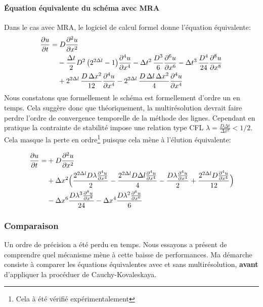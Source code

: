 \paragraph{Équation équivalente du schéma avec MRA}
    Dans le cas avec MRA, le logiciel de calcul formel donne l'équation équivalente:
    \begin{align}
        \frac{\partial u}{\partial t} =&\; D \frac{\partial^2 u}{\partial x^2} \\\notag
        &- \frac{\Delta t}{2} D^2\, \bigl( 2^{2\Delta l}- 1 \bigr)          \frac{\partial^4 u}{\partial x^4}
        - \Delta t^2\, \frac{D^3}{6}          \frac{\partial^6 u}{\partial x^6}
        - \Delta t^3\, \frac{D^4}{24}         \frac{\partial^8 u}{\partial x^8} \\\notag
        &+ 2^{2\Delta l}\, \frac{D\, \Delta x^2}{12}    \frac{\partial^4 u}{\partial x^4}
        - 2^{2\Delta l}\, \frac{D\, \Delta l\, \Delta x^2}{4} \frac{\partial^4 u}{\partial x^4}
    \end{align}
    Nous constatons que formellement le schéma est formellement d'ordre un en temps.
    Cela suggère donc que théoriquement, la multirésolution devrait faire perdre l'ordre de convergence temporelle de la méthode des lignes.
    Cependant en pratique la contrainte de stabilité impose une relation type CFL $\lambda = \frac{D \Delta t } {\Delta x^2} < 1/2$.
    Cela masque la perte en ordre\footnote{Cela à été vérifié expérimentalement} puisque cela mène à l’élution équivalente:

    \begin{align}
        \frac{\partial u}{\partial t}
        =&+ D \frac{\partial^{2}u}{\partial x^{2}}\\\notag
        &+ \Delta x^{2}\Bigl(\frac{2^{2 \Delta l} D  \lambda \frac{\partial^{4}u}{\partial x^{4}}}{2} 
        -  \frac{2^{2 \Delta l} D \Delta l \frac{\partial^{4}u}{\partial x^{4}}}{4} 
        -  \frac{D \lambda \frac{\partial^{4}u}{\partial x^{4}}}{2} 
        +  \frac{2^{2 \Delta l} D\frac{\partial^{4}u}{\partial x^{4}}}{12}\Bigr)\\\notag
        &- \Delta x^{6} \frac{D \lambda^{3} \frac{\partial^{8}u}{\partial x^{8}}}{24} 
        - \Delta x^{4} \frac{D \lambda^{2} \frac{\partial^{6}u}{\partial x^{6}}}{6} 
    \end{align}
\subsubsection{Comparaison}
    Un ordre de précision a été perdu en temps. Nous essayons a présent de comprendre quel mécanisme mène à cette baisse de performances.
    Ma démarche consiste à comparer les équations équivalentes avec et sans multirésolution, \textbf{avant} d'appliquer la procéduer de Cauchy-Kovaleskaya.
